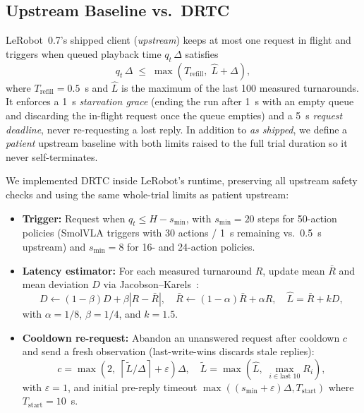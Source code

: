 \documentclass[conference]{IEEEtran}
\newcommand{\drtc}{DRTC}
\newcommand{\smolvla}{SmolVLA}
\begin{document}
\subsection{Upstream Baseline vs.\ DRTC}

LeRobot~0.7's shipped client (\emph{upstream}) keeps at most one request in flight and triggers when queued playback time $q_t\,\Delta$ satisfies
\begin{equation}
  q_t\,\Delta \;\le\; \max\!\left(T_{\mathrm{refill}},\; \hat{L} + \Delta\right),
\end{equation}
where $T_{\mathrm{refill}}=0.5$~s and $\hat{L}$ is the maximum of the last 100 measured turnarounds. It enforces a 1~s \emph{starvation grace} (ending the run after 1~s with an empty queue and discarding the in-flight request once the queue empties) and a 5~s \emph{request deadline}, never re-requesting a lost reply. In addition to \emph{as shipped}, we define a \emph{patient} upstream baseline with both limits raised to the full trial duration so it never self-terminates.

We implemented \drtc{} inside LeRobot's runtime, preserving all upstream safety checks and using the same whole-trial limits as patient upstream:
\begin{itemize}
  \item \textbf{Trigger:} Request when $q_t \le H - s_{\min}$, with $s_{\min}=20$ steps for 50-action policies (\smolvla{} triggers with 30 actions / 1~s remaining vs.\ 0.5~s upstream) and $s_{\min}=8$ for 16- and 24-action policies.
  \item \textbf{Latency estimator:} For each measured turnaround $R$, update mean $\bar{R}$ and mean deviation $D$ via Jacobson--Karels~\cite{rfc6298}:
  \begin{equation}
    D \leftarrow (1-\beta)D + \beta|R-\bar{R}|,\quad
    \bar{R} \leftarrow (1-\alpha)\bar{R} + \alpha R,\quad
    \hat{L} = \bar{R} + kD,
  \end{equation}
  with $\alpha=1/8$, $\beta=1/4$, and $k=1.5$.
  \item \textbf{Cooldown re-request:} Abandon an unanswered request after cooldown $c$ and send a fresh observation (last-write-wins discards stale replies):
  \begin{equation}
    c = \max\!\left(2,\; \left\lceil \tilde{L}/\Delta \right\rceil + \varepsilon\right)\Delta,\quad
    \tilde{L} = \max\!\left(\hat{L},\; \max_{i\in \text{last }10} R_i\right),
  \end{equation}
  with $\varepsilon=1$, and initial pre-reply timeout $\max((s_{\min}+\varepsilon)\Delta, T_{\mathrm{start}})$ where $T_{\mathrm{start}}=10$~s.
\end{itemize}
\end{document}
